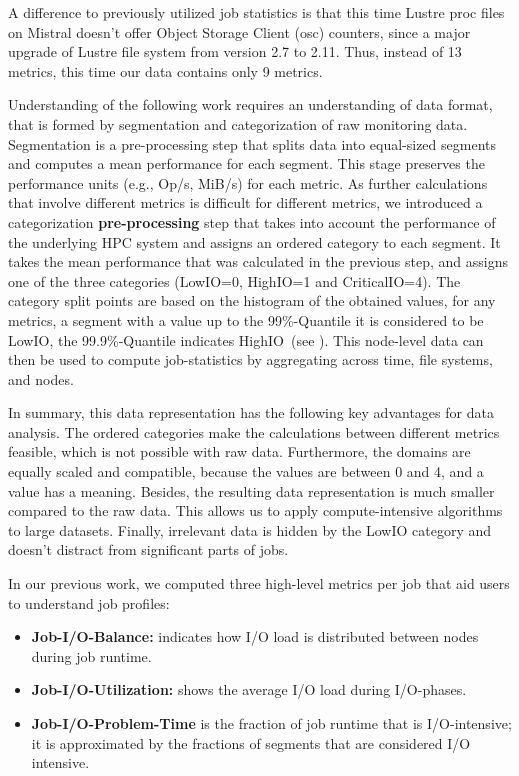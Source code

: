 \documentclass[]{llncs}
\begin{document}
A difference to previously utilized job statistics is that this time Lustre proc files on Mistral doesn't offer Object Storage Client (osc) counters, since a major upgrade of Lustre file system from version 2.7 to 2.11.
Thus, instead of 13 metrics, this time our data contains only 9 metrics.

Understanding of the following work requires an understanding of data format, that is formed by segmentation and categorization of raw monitoring data.
Segmentation is a pre-processing step that splits data into equal-sized segments and computes a mean performance for each segment.
This stage preserves the performance units (e.g., Op/s, MiB/s) for each metric.
As further calculations that involve different metrics is difficult for different metrics, we introduced a categorization\textbf{ pre-processing} step that takes into account the performance of the underlying HPC system and assigns an ordered category to each segment.
It takes the mean performance that was calculated in the previous step, and assigns one of the three categories (LowIO=0, HighIO=1 and CriticalIO=4).
The category split points are based on the histogram of the obtained values, for any metrics, a segment with a value up to the 99\%-Quantile it is considered to be LowIO, the 99.9\%-Quantile indicates HighIO~(see \cite{iocats2020}).
This node-level data can then be used to compute job-statistics by aggregating across time, file systems, and nodes.

In summary, this data representation has the following key advantages for data analysis.
The ordered categories make the calculations between different metrics feasible, which is not possible with raw data.
Furthermore, the domains are equally scaled and compatible, because the values are between 0 and 4, and a value has a meaning.
Besides, the resulting data representation is much smaller compared to the raw data.
This allows us to apply compute-intensive algorithms to large datasets.
Finally, irrelevant data is hidden by the LowIO category and doesn't distract from significant parts of jobs.

In our previous work, we computed three high-level metrics per job that aid users to understand job profiles:

\begin{itemize}
	\item \textbf{Job-I/O-Balance:} indicates how I/O load is distributed between nodes during job runtime.
	\item \textbf{Job-I/O-Utilization:} shows the average I/O load during I/O-phases.
	\item \textbf{Job-I/O-Problem-Time} is the fraction of job runtime that is I/O-intensive; it is approximated by the fractions of segments that are considered I/O intensive.
\end{itemize}
\end{document}
